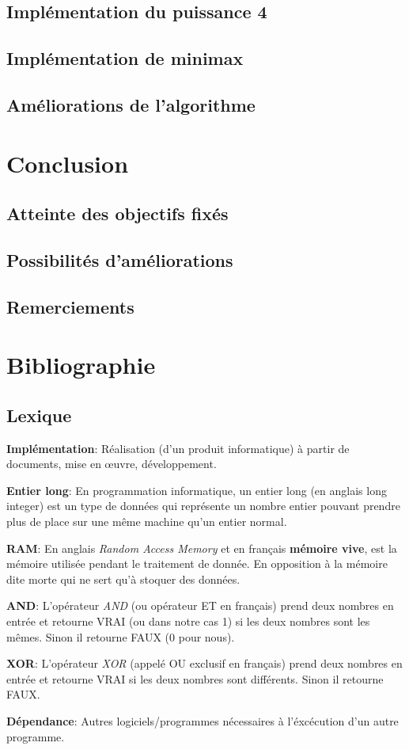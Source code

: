 \documentclass[a4paper]{article}
\newcommand{\lexique}[2]{\item{\textbf{#1}:} #2}
\begin{document}
\subsection{Implémentation du puissance 4}

\subsection{Implémentation de minimax}

\subsection{Améliorations de l'algorithme}


\section{Conclusion}
\subsection{Atteinte des objectifs fixés}
\subsection{Possibilités d'améliorations}
\subsection{Remerciements}

\newpage
\section{Bibliographie}
\subsection{Lexique}
    \begin{description}
        \lexique{Implémentation}{Réalisation (d’un produit informatique) à partir de documents, mise en œuvre, développement.}
        \lexique{Entier long}{En programmation informatique, un entier long (en anglais long integer) est un type de données qui représente un nombre entier pouvant prendre plus de place sur une même machine qu'un entier normal.}
        \lexique{RAM}{En anglais \textit{Random Access Memory} et en français \textbf{mémoire vive}, est la mémoire utilisée pendant le traitement de donnée. En opposition à la mémoire dite morte qui ne sert qu'à stoquer des données.}
        \lexique{AND}{L'opérateur \textit{AND} (ou opérateur ET en français) prend deux nombres en entrée et retourne VRAI (ou dans notre cas 1) si les deux nombres sont les mêmes. Sinon il retourne FAUX (0 pour nous).}
        \lexique{XOR}{L'opérateur \textit{XOR} (appelé OU exclusif en français) prend deux nombres en entrée et retourne VRAI si les deux nombres sont différents. Sinon il retourne FAUX.}
	    \lexique{Dépendance}{Autres logiciels/programmes nécessaires à l'éxcécution d'un autre programme.}
    \end{description}
\end{document}
